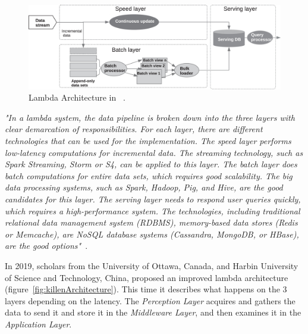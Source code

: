 \documentclass[a4paper,12pt,twoside]{ThesisStyle}
\begin{document}
\begin{figure}[hbt]
\centering
\includegraphics[width=13 cm]{imatges/lambdaArchitecture.jpeg}
\caption{\label{fig:lambdaArchitecture} Lambda Architecture in ~\cite{liu2018scalable}.}
\end{figure}

\textit{"In a lambda system, the data pipeline is broken down into the three layers with clear demarcation of responsibilities. For each layer, there are different technologies that can be used for the implementation. The speed layer performs low-latency computations for incremental data. The streaming technology, such as Spark Streaming, Storm or S4, can be applied to this layer. The batch layer does batch computations for entire data sets, which requires good scalability. The big data processing systems, such as Spark, Hadoop, Pig, and Hive, are the good candidates for this layer. The serving layer needs to respond user queries quickly, which requires a high-performance system. The technologies, including traditional relational data management system (RDBMS), memory-based data stores (Redis or Memcache), are NoSQL database systems (Cassandra, MongoDB, or HBase), are the good options"}~\cite{liu2018scalable}.

In 2019, scholars from the University of Ottawa, Canada, and Harbin University of Science and Technology,  China, proposed an improved lambda architecture (figure~\ref{fig:killenArchitecture}). This time it describes what happens on the 3 layers depending on the latency. The \textit{Perception Layer} acquires and gathers the data to send it and store it in the \textit{Middleware Layer}, and then examines it in the \textit{Application Layer}. 
\end{document}
